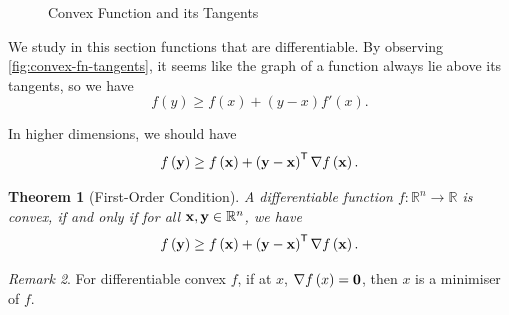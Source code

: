 \documentclass[11pt]{article}
\newtheorem{theorem}{Theorem}[section]
\theoremstyle{definition}
\theoremstyle{remark}
\newtheorem{remark}[theorem]{Remark}
\newcommand{\pqty}[1]{\left(#1\right)}
\newcommand{\functiondomain}[3]{#1:#2\to #3}
\newcommand{\RR}{\mathbb{R}}
\newcommand{\transpose}{^{\mathsf{T}}}
\newcommand{\grad}{\nabla}
\begin{document}
\begin{figure}[ht!]
    \centering

    \caption{Convex Function and its Tangents}
    \label{fig:convex-fn-tangents}
\end{figure}

We study in this section functions that are differentiable. By observing \autoref{fig:convex-fn-tangents}, it seems like the graph of a function always lie above its tangents, so we have
\[
    f\pqty{y} \geq f\pqty{x} + \pqty{y - x} f'\pqty{x}.
\]

In higher dimensions, we should have
\[
    f\pqty{\vb{y}} \geq f\pqty{\vb{x}} + \pqty{\vb{y} - \vb{x}} \transpose \grad f\pqty{\vb{x}}.
\]

\begin{theorem}[First-Order Condition]\label{optim-unit-0006}
    \label{thm:first-order-condition}%
    A differentiable function \(\functiondomain{f}{\RR^n}{\RR}\) is convex, if and only if for all \(\vb{x}, \vb{y} \in \RR^n\), we have
    \[
        f\pqty{\vb{y}} \geq f\pqty{\vb{x}} + \pqty{\vb{y} - 
        \vb{x}}\transpose \grad f\pqty{\vb{x}}.
    \]  
\end{theorem}

\begin{remark}\label{optim-unit-0007}
    For differentiable convex \(f\), if at \(x\), \(\grad f\pqty{x} = \vb{0}\), then \(x\) is a minimiser of \(f\).
\end{remark}
\end{document}
